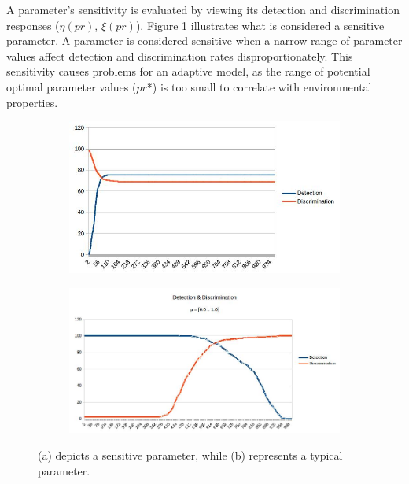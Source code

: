 \documentclass[12pt]{report}
\begin{document}
A parameter's sensitivity is evaluated by viewing its detection and discrimination responses ($\eta(pr)$, $\xi(pr)$). Figure \ref{fig:paramsensitivity} illustrates what is considered a sensitive parameter. A parameter is considered sensitive when a narrow range of parameter values affect detection and discrimination rates disproportionately. This sensitivity causes problems for an adaptive model, as the range of potential optimal parameter values ($pr$*) is too small to correlate with environmental properties. 

\begin{figure}
\centering
\begin{subfigure}{.49\linewidth}
  \includegraphics[width=1\linewidth]{figures/sensitive_param.jpg}
  \caption{}
\end{subfigure}
\hfill
\begin{subfigure}{.49\linewidth}
  \includegraphics[width=1\linewidth]{figures/campus_dd.jpg}
  \caption{}
\end{subfigure}

\caption{(a) depicts a sensitive parameter, while (b) represents a typical parameter.}
\label{fig:paramsensitivity}
\end{figure}
\end{document}
